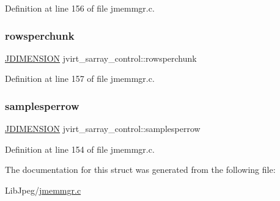Definition at line 156 of file jmemmgr.\+c.

\mbox{\label{structjvirt__sarray__control_ad1c55661955e1600d447ad754c6aece1}} 
\subsubsection{\texorpdfstring{rowsperchunk}{rowsperchunk}}
{\footnotesize\ttfamily \mbox{\hyperlink{jmorecfg_8h_a04ed4674f6f1d0d50ec241531e38274f}{J\+D\+I\+M\+E\+N\+S\+I\+ON}} jvirt\+\_\+sarray\+\_\+control\+::rowsperchunk}



Definition at line 157 of file jmemmgr.\+c.

\mbox{\label{structjvirt__sarray__control_a3b6c756c3a71dc8023672093a60cc4f1}} 
\subsubsection{\texorpdfstring{samplesperrow}{samplesperrow}}
{\footnotesize\ttfamily \mbox{\hyperlink{jmorecfg_8h_a04ed4674f6f1d0d50ec241531e38274f}{J\+D\+I\+M\+E\+N\+S\+I\+ON}} jvirt\+\_\+sarray\+\_\+control\+::samplesperrow}



Definition at line 154 of file jmemmgr.\+c.



The documentation for this struct was generated from the following file\+:\begin{DoxyCompactItemize}
\item 
Lib\+Jpeg/\mbox{\hyperlink{jmemmgr_8c}{jmemmgr.\+c}}\end{DoxyCompactItemize}
